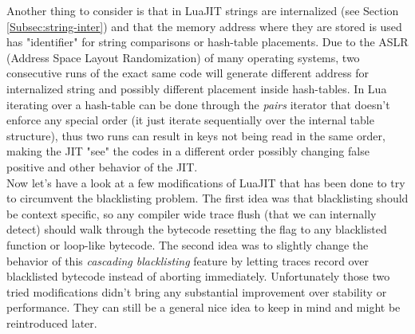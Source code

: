 Another thing to consider is that in LuaJIT strings are internalized (see
Section \ref{Subsec:string-inter}) and that the memory address where they are
stored is used has "identifier" for string comparisons or hash-table placements.
Due to the ASLR (Address Space Layout Randomization) of many operating systems,
two consecutive runs of the exact same code will generate different address for
internalized string and possibly different placement inside hash-tables. In Lua
iterating over a hash-table can be done through the \emph{pairs} iterator that
doesn't enforce any special order (it just iterate sequentially over the internal
table structure), thus two runs can result in keys not being read in the same order,
making the JIT "see" the codes in a different order possibly changing false positive
and other behavior of the JIT.\\

Now let's have a look at a few modifications of LuaJIT that has been done to try
to circumvent the blacklisting problem. The first idea was that blacklisting
should be context specific, so any compiler wide trace flush (that we can
internally detect) should walk through the bytecode resetting the flag to any
blacklisted function or loop-like bytecode. The second idea was to slightly
change the behavior of this \emph{cascading blacklisting} feature by letting
traces record over blacklisted bytecode instead of aborting immediately.
Unfortunately those two tried modifications didn't bring any substantial
improvement over stability or performance. They can still be a general nice idea
to keep in mind and might be reintroduced later.

